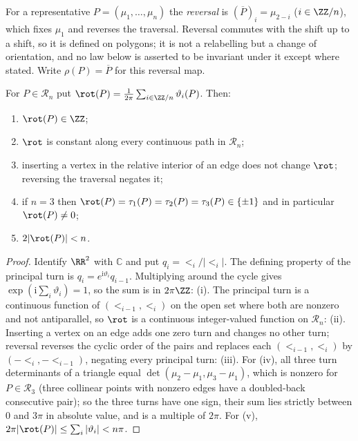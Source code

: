\begin{definition}[reversal]\label{def:shift}\leanok
For a representative $P=(\mu_1,\ldots,\mu_n)$ the \emph{reversal} is
$(\overline P)_i=\mu_{2-i}$ ($i\in\ZZ/n$), which fixes $\mu_1$ and reverses
the traversal. Reversal commutes with the shift up
to a shift, so it is defined on polygons; it is not a relabelling but a change
of orientation, and no law below is asserted to be invariant under it except
where stated. Write $\rho(P)=\overline P$ for this reversal map.
\end{definition}

\begin{lemma}\label{lem:rot}\leanok
For $P\in\mathcal R_n$ put $\rot(P)=\frac1{2\pi}\sum_{i\in\ZZ/n}\vartheta_i(P)$.
Then:
\begin{enumerate}
\item[(i)] $\rot(P)\in\ZZ$;
\item[(ii)] $\rot$ is constant along every continuous path in $\mathcal R_n$;
\item[(iii)] inserting a vertex in the relative interior of an edge does not
change $\rot$; reversing the traversal negates
it;
\item[(iv)] if $n=3$ then $\rot(P)=\tau_1(P)=\tau_2(P)=\tau_3(P)\in\{\pm1\}$
and in particular $\rot(P)\neq0$;
\item[(v)] $2|\rot(P)|<n$.
\end{enumerate}

\end{lemma}
\begin{proof}\leanok
Identify $\RR^2$ with $\mathbb C$ and put $q_i=\lt_i/|\lt_i|$. The defining
property of the principal turn is $q_i=e^{\mathrm i\vartheta_i}q_{i-1}$.
Multiplying around the cycle gives $\exp(\mathrm i\sum_i\vartheta_i)=1$, so
the sum is in $2\pi\ZZ$: (i). The principal turn is a continuous function of
$(\lt_{i-1},\lt_i)$ on the open set where both are nonzero and not
antiparallel, so $\rot$ is a continuous integer-valued function on
$\mathcal R_n$: (ii). Inserting a vertex on an edge adds one zero turn and
changes no other turn; reversal reverses the cyclic order of the pairs and
replaces each $(\lt_{i-1},\lt_i)$ by $(-\lt_i,-\lt_{i-1})$, negating every
principal turn: (iii). For (iv), all three turn determinants of a triangle
equal $\det(\mu_2-\mu_1,\mu_3-\mu_1)$, which is nonzero for $P\in\mathcal R_3$
(three collinear points with nonzero edges have a doubled-back consecutive
pair); so the three turns have one sign, their sum lies strictly between $0$
and $3\pi$ in absolute value, and is a multiple of $2\pi$. For (v),
$2\pi|\rot(P)|\leq\sum_i|\vartheta_i|<n\pi$.
\end{proof}

